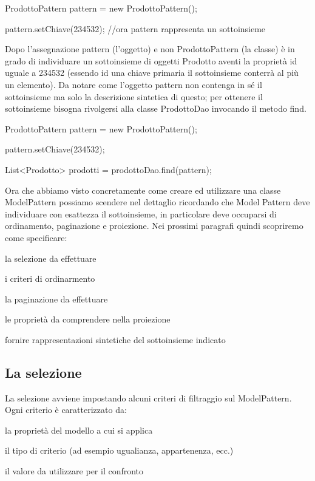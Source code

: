 \begin{java}
ProdottoPattern pattern = new ProdottoPattern();

pattern.setChiave(234532); //ora pattern rappresenta un sottoinsieme
\end{java}

Dopo l'assegnazione pattern (l'oggetto) e non ProdottoPattern (la classe) è in grado di individuare un sottoinsieme di oggetti Prodotto aventi la proprietà id uguale a 234532 (essendo id una chiave primaria il sottoinsieme conterrà al più un elemento). Da notare come l'oggetto pattern non contenga in sé il sottoinsieme ma solo la descrizione sintetica di questo; per ottenere il sottoinsieme bisogna rivolgersi alla classe ProdottoDao invocando il metodo find.

\begin{java}
ProdottoPattern pattern = new ProdottoPattern();

pattern.setChiave(234532); 

List<Prodotto> prodotti = prodottoDao.find(pattern);
\end{java}

Ora che abbiamo visto concretamente come creare ed utilizzare una classe ModelPattern possiamo scendere nel dettaglio ricordando che Model Pattern deve individuare con esattezza il sottoinsieme, in particolare deve occuparsi di ordinamento, paginazione e proiezione. Nei prossimi paragrafi quindi scopriremo come specificare:

\begin{enumerate*}
  \item la selezione da effettuare
  \item i criteri di ordinarmento
  \item la paginazione da effettuare 
  \item le proprietà da comprendere nella proiezione
  \item fornire rappresentazioni sintetiche del sottoinsieme indicato
\end{enumerate*}

\subsection{La selezione}
La selezione avviene impostando alcuni criteri di filtraggio sul ModelPattern. Ogni criterio è caratterizzato da:

\begin{enumerate*}
  \item la proprietà del modello a cui si applica
  \item il tipo di criterio (ad esempio ugualianza, appartenenza, ecc.) 
  \item il valore da utilizzare per il confronto
\end{enumerate*}

